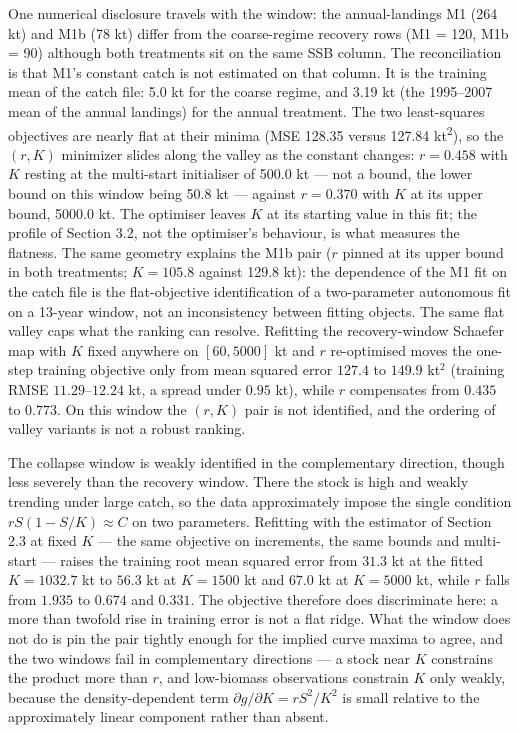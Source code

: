 \documentclass[11pt]{article}
\begin{document}
One numerical disclosure travels with the window: the annual-landings M1
(264 kt) and M1b (78 kt) differ from the coarse-regime recovery rows (M1
= 120, M1b = 90) although both treatments sit on the same SSB column.
The reconciliation is that M1's constant catch is not estimated on that
column. It is the training mean of the catch file: 5.0 kt for the coarse
regime, and 3.19 kt (the 1995--2007 mean of the annual landings) for the
annual treatment. The two least-squares objectives are nearly flat at
their minima (MSE 128.35 versus 127.84 kt\textsuperscript{2}), so the
\((r, K)\) minimizer slides along the valley as the constant changes:
\(r = 0.458\) with \(K\) resting at the multi-start initialiser of
500.0 kt --- not a bound, the lower bound on this window being 50.8 kt
--- against \(r = 0.370\) with \(K\) at its upper bound, 5000.0 kt. The optimiser leaves \(K\) at its starting value in this fit; the
profile of Section 3.2, not the optimiser's behaviour, is what
measures the flatness. The
same geometry explains the M1b pair (\(r\) pinned at its
upper bound in both treatments; \(K = 105.8\) against 129.8 kt): the
dependence of the M1 fit on the catch file is the flat-objective
identification of a two-parameter autonomous fit on a 13-year window,
not an inconsistency between fitting objects. The same flat valley caps what the ranking can resolve. Refitting the
recovery-window Schaefer map with \(K\) fixed anywhere on
\([60, 5000]\) kt and \(r\) re-optimised moves the one-step training
objective only from mean squared error \(127.4\) to \(149.9\) kt\(^2\)
(training RMSE \(11.29\)--\(12.24\) kt, a spread under \(0.95\) kt),
while \(r\) compensates from \(0.435\) to \(0.773\). On this window the
\((r, K)\) pair is not identified, and the ordering of valley variants
is not a robust ranking.

The collapse window is weakly identified in the complementary direction,
though less severely than the recovery window. There the stock is high
and weakly trending under large catch, so the data approximately impose
the single condition \(rS(1-S/K)\approx C\) on two parameters. Refitting
with the estimator of Section 2.3 at fixed \(K\) --- the same objective
on increments, the same bounds and multi-start --- raises the training
root mean squared error from \(31.3\) kt at the fitted
\(K = 1032.7\) kt to \(56.3\) kt at \(K = 1500\) kt and \(67.0\) kt at
\(K = 5000\) kt, while \(r\) falls from \(1.935\) to \(0.674\) and
\(0.331\). The objective therefore does discriminate here: a more than
twofold rise in training error is not a flat ridge. What the window does
not do is pin the pair tightly enough for the implied curve maxima to
agree, and the two windows fail in complementary directions --- a stock
near \(K\) constrains the product more than \(r\), and low-biomass
observations constrain \(K\) only weakly, because the density-dependent
term \(\partial g/\partial K = rS^{2}/K^{2}\) is small relative to the
approximately linear component rather than absent.
\end{document}

